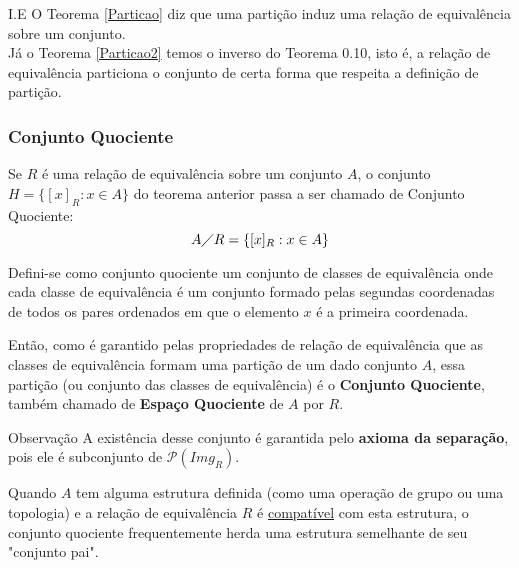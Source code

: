          \begin{mymdframed}{I.E}
            O Teorema \ref{Particao} diz que uma partição induz uma relação de equivalência sobre um conjunto.\\
            Já o Teorema \ref{Particao2} temos o inverso do Teorema 0.10, isto é, a relação de equivalência particiona o conjunto de certa forma que respeita a definição de partição.
         \end{mymdframed}

      \subsubsection{Conjunto Quociente}
         Se $R$ é uma relação de equivalência sobre um conjunto $A$, o conjunto $H = \{[x]_{R}: x \in A\}$ do teorema anterior passa a ser chamado de Conjunto Quociente:
         $$A \diagup R = \{[x]_{R}: x \in A\}$$
         \begin{definition}
            Defini-se como conjunto quociente um conjunto de classes de equivalência onde cada classe de equivalência é um conjunto formado pelas segundas coordenadas de todos os pares ordenados em que o elemento $x$ é a primeira coordenada.
         \end{definition}
         Então, como é garantido pelas propriedades de relação de equivalência que as classes de equivalência formam uma partição de um dado conjunto $A$, essa partição (ou conjunto das classes de equivalência) é o \textbf{Conjunto Quociente}, também chamado de \textbf{Espaço Quociente} de $A$ por $R$.
         \begin{mymdframed}{Observação}
            A existência desse conjunto é garantida pelo \textbf{axioma da separação}, pois ele é subconjunto de $\mathcal{P}(\mathit{Img}_{R})$.
         \end{mymdframed}
         Quando $A$ tem alguma estrutura definida (como uma operação de grupo ou uma topologia) e a relação de equivalência $R$ é \underline{compatível} com esta estrutura, o conjunto quociente frequentemente herda uma estrutura semelhante de seu "conjunto pai".

